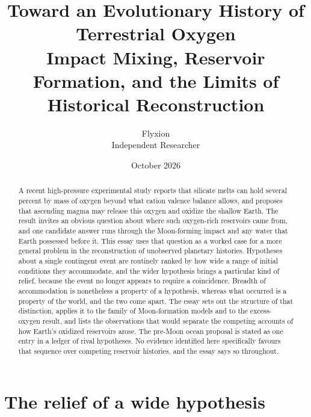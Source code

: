 \documentclass[11pt]{article}
\title{Toward an Evolutionary History of Terrestrial Oxygen\\[0.4em]
\large Impact Mixing, Reservoir Formation, and the Limits of Historical Reconstruction}
\author{Flyxion\\Independent Researcher}
\date{October 2026}
\begin{document}
\maketitle

\begin{abstract}
\noindent
A recent high-pressure experimental study reports that silicate melts can hold several percent by mass of oxygen beyond what cation valence balance allows, and proposes that ascending magma may release this oxygen and oxidize the shallow Earth. The result invites an obvious question about where such oxygen-rich reservoirs came from, and one candidate answer runs through the Moon-forming impact and any water that Earth possessed before it. This essay uses that question as a worked case for a more general problem in the reconstruction of unobserved planetary histories. Hypotheses about a single contingent event are routinely ranked by how wide a range of initial conditions they accommodate, and the wider hypothesis brings a particular kind of relief, because the event no longer appears to require a coincidence. Breadth of accommodation is nonetheless a property of a hypothesis, whereas what occurred is a property of the world, and the two come apart. The essay sets out the structure of that distinction, applies it to the family of Moon-formation models and to the excess-oxygen result, and lists the observations that would separate the competing accounts of how Earth's oxidized reservoirs arose. The pre-Moon ocean proposal is stated as one entry in a ledger of rival hypotheses. No evidence identified here specifically favours that sequence over competing reservoir histories, and the essay says so throughout.
\end{abstract}

\section{The relief of a wide hypothesis}
\end{document}
